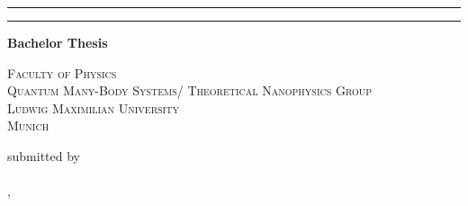 \begin{titlepage}   

    {\parindent0cm
    \rule{\linewidth}{.4ex}}  
  \begin{center}
    {\sffamily \bfseries \Huge \getTitleEN}
  \end{center}
    \rule{\linewidth}{.4ex}
  

  \begin{center}
    {\rmfamily \bfseries \Large Bachelor Thesis}


    {\scshape \large
     Faculty of Physics \\
     Quantum Many-Body Systems/ Theoretical Nanophysics Group\\
     Ludwig Maximilian University\\ 
     Munich


     submitted by \\

     {\rmfamily \bfseries \Large \getAuthor} \\


     \getPrintLocationEN, \getSubmissionDateEN
     }
  \end{center}
  
\end{titlepage}
